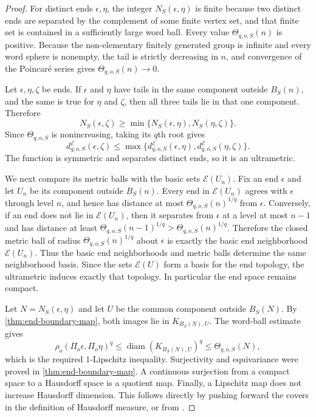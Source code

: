 \documentclass[11pt]{article}
\theoremstyle{definition}
\newcommand{\diam}{\operatorname{diam}}
\begin{document}
\begin{proof}
For distinct ends $\epsilon,\eta$, the integer $N_S(\epsilon,\eta)$ is finite because two
distinct ends are separated by the complement of some finite vertex set, and that finite set
is contained in a sufficiently large word ball.  Every value
$\Theta_{q,o,S}(n)$ is positive.  Because the non-elementary finitely generated group is
infinite and every word sphere is nonempty, the tail is strictly decreasing in $n$, and convergence
of the Poincar\'e series gives $\Theta_{q,o,S}(n)\to0$.

Let $\epsilon,\eta,\zeta$ be ends.  If $\epsilon$ and $\eta$ have tails in the same component
outside $B_S(n)$, and the same is true for $\eta$ and $\zeta$, then all three tails lie in that
one component.  Therefore
\[
 N_S(\epsilon,\zeta)\ge
 \min\{N_S(\epsilon,\eta),N_S(\eta,\zeta)\}.
\]
Since $\Theta_{q,o,S}$ is nonincreasing, taking its $q$th root gives
\[
 d^{\mathcal E}_{q,o,S}(\epsilon,\zeta)
 \le\max\{d^{\mathcal E}_{q,o,S}(\epsilon,\eta),
 d^{\mathcal E}_{q,o,S}(\eta,\zeta)\}.
\]
The function is symmetric and separates distinct ends, so it is an ultrametric.

We next compare its metric balls with the basic sets $\mathcal E(U_n)$.  Fix an end $\epsilon$ and let $U_n$ be its
component outside $B_S(n)$.  Every end in $\mathcal E(U_n)$ agrees with $\epsilon$ through
level $n$, and hence has distance at most $\Theta_{q,o,S}(n)^{1/q}$ from $\epsilon$.
Conversely, if an end does not lie in $\mathcal E(U_n)$, then it separates from $\epsilon$
at a level at most $n-1$ and has distance at least
$\Theta_{q,o,S}(n-1)^{1/q}>\Theta_{q,o,S}(n)^{1/q}$.  Therefore the closed metric ball
of radius $\Theta_{q,o,S}(n)^{1/q}$ about $\epsilon$ is exactly the basic end neighborhood $\mathcal E(U_n)$.  Thus the basic end neighborhoods
and metric balls determine the same neighborhood basis.  Since the sets $\mathcal E(U)$ form
a basis for the end topology, the ultrametric
induces exactly that topology.  In particular the end space remains compact.

Let $N=N_S(\epsilon,\eta)$ and let $U$ be the common component outside $B_S(N)$.  By
\cref{thm:end-boundary-map}, both images lie in $K_{B_S(N),U}$.  The word-ball estimate gives
\[
 \rho_o(\Pi_o\epsilon,\Pi_o\eta)^q
 \le\diam(K_{B_S(N),U})^q
 \le\Theta_{q,o,S}(N),
\]
which is the required $1$-Lipschitz inequality.  Surjectivity and equivariance were proved in
\cref{thm:end-boundary-map}.  A continuous surjection from a compact space to a Hausdorff
space is a quotient map.  Finally, a Lipschitz map does not increase Hausdorff dimension.
This follows directly by pushing forward the covers in the definition of Hausdorff measure,
or from \cite[Chapter~8]{Heinonen2001}.
\end{proof}
\end{document}
